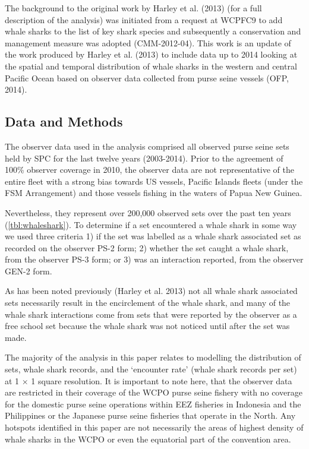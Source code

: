 \documentclass[12pt]{SCreport}
\begin{document}
The background to the original work by Harley et al. (2013) (for a full description of the analysis) was initiated from a request at WCPFC9 to add whale sharks to the list of key shark species and subsequently a conservation and management measure was adopted (CMM-2012-04).  This work is an update of the work produced by Harley et al. (2013) to include data up to 2014 looking at the spatial and temporal distribution of whale sharks in the western and central Pacific Ocean based on observer data collected from purse seine vessels (OFP, 2014).
  
\subsection{Data and Methods}
The observer data used in the analysis comprised all observed purse seine sets held by SPC for the last twelve years (2003-2014). Prior to the agreement of 100\% observer coverage in 2010, the observer data are not representative of the entire fleet with a strong bias towards US vessels, Pacific Islands fleets (under the FSM Arrangement) and those vessels fishing in the waters of Papua New Guinea.

Nevertheless, they represent over 200,000 observed sets over the past ten years (\ref{tbl:whaleshark}). To determine if a set encountered a whale shark in some way we used three criteria 1) if the set was labelled as a whale shark associated set as recorded on the observer PS-2 form; 2) whether the set caught a whale shark, from the observer PS-3 form; or 3) was an interaction reported, from the observer GEN-2 form.

As has been noted previously (Harley et al. 2013) not all whale shark associated sets necessarily result in the encirclement of the whale shark, and many of the whale shark interactions come from sets that were reported by the observer as a free school set because the whale shark was not noticed until after the set was made. 

The majority of the analysis in this paper relates to modelling the distribution of sets, whale shark records, and the `encounter rate' (whale shark records per set) at 1 $\times$ 1 \degree square resolution. It is important to note here, that the observer data are restricted in their coverage of the WCPO purse seine fishery with no coverage for the domestic purse seine operations within EEZ fisheries in Indonesia and the Philippines or the Japanese purse seine fisheries that operate in the North. Any hotspots identified in this paper are not necessarily the areas of highest density of whale sharks in the WCPO or even the equatorial part of the convention area.
\end{document}
